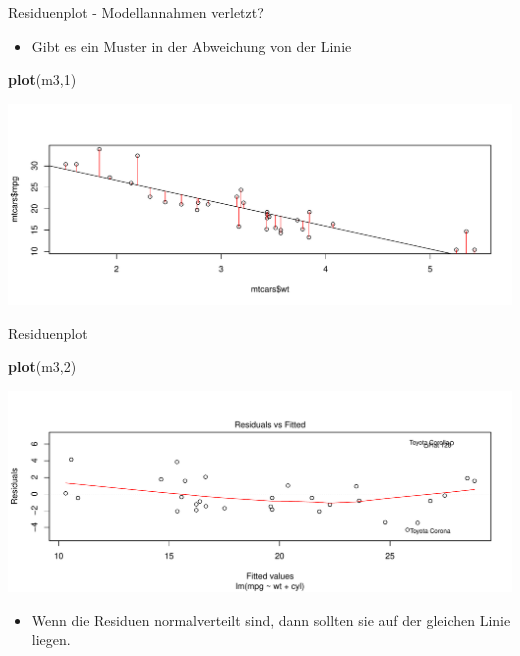 \documentclass[
  ignorenonframetext,
]{beamer}
\newenvironment{Shaded}{\begin{snugshade}}{\end{snugshade}}
\newcommand{\DecValTok}[1]{\textcolor[rgb]{0.27,0.67,0.26}{#1}}
\newcommand{\KeywordTok}[1]{\textcolor[rgb]{0.26,0.66,0.93}{\textbf{#1}}}
\newcommand{\NormalTok}[1]{\textcolor[rgb]{0.74,0.68,0.62}{#1}}
\providecommand{\tightlist}{%
  \setlength{\itemsep}{0pt}\setlength{\parskip}{0pt}}
\begin{document}
\begin{frame}[fragile]{Residuenplot - Modellannahmen verletzt?}
\protect\hypertarget{residuenplot---modellannahmen-verletzt}{}

\begin{itemize}
\tightlist
\item
  Gibt es ein Muster in der Abweichung von der Linie
\end{itemize}

\begin{Shaded}
\begin{Highlighting}[]
\KeywordTok{plot}\NormalTok{(m3,}\DecValTok{1}\NormalTok{)}
\end{Highlighting}
\end{Shaded}

\includegraphics{LineareRegression_files/figure-beamer/unnamed-chunk-28-1.pdf}

\end{frame}

\begin{frame}[fragile]{Residuenplot}
\protect\hypertarget{residuenplot-2}{}

\begin{Shaded}
\begin{Highlighting}[]
\KeywordTok{plot}\NormalTok{(m3,}\DecValTok{2}\NormalTok{)}
\end{Highlighting}
\end{Shaded}

\includegraphics{LineareRegression_files/figure-beamer/unnamed-chunk-29-1.pdf}

\begin{itemize}
\tightlist
\item
  Wenn die Residuen normalverteilt sind, dann sollten sie auf der
  gleichen Linie liegen.
\end{itemize}

\end{frame}
\end{document}
